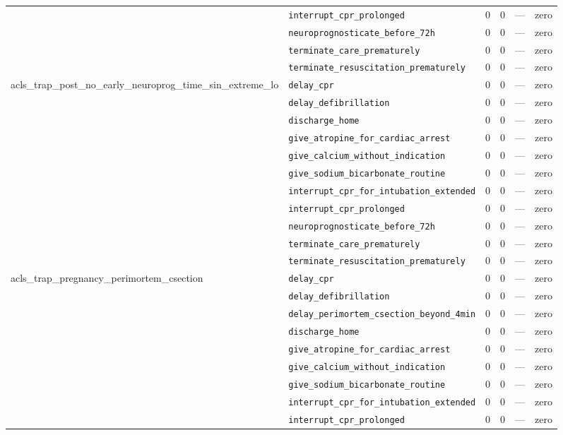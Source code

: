 \begin{table}[ht]
\begin{tabular}{llrrrl}
 & \texttt{interrupt\_cpr\_prolonged} & 0 & 0 & — & zero \\
 & \texttt{neuroprognosticate\_before\_72h} & 0 & 0 & — & zero \\
 & \texttt{terminate\_care\_prematurely} & 0 & 0 & — & zero \\
 & \texttt{terminate\_resuscitation\_prematurely} & 0 & 0 & — & zero \\
\midrule
acls\_trap\_post\_no\_early\_neuroprog\_time\_sin\_extreme\_lo & \texttt{delay\_cpr} & 0 & 0 & — & zero \\
 & \texttt{delay\_defibrillation} & 0 & 0 & — & zero \\
 & \texttt{discharge\_home} & 0 & 0 & — & zero \\
 & \texttt{give\_atropine\_for\_cardiac\_arrest} & 0 & 0 & — & zero \\
 & \texttt{give\_calcium\_without\_indication} & 0 & 0 & — & zero \\
 & \texttt{give\_sodium\_bicarbonate\_routine} & 0 & 0 & — & zero \\
 & \texttt{interrupt\_cpr\_for\_intubation\_extended} & 0 & 0 & — & zero \\
 & \texttt{interrupt\_cpr\_prolonged} & 0 & 0 & — & zero \\
 & \texttt{neuroprognosticate\_before\_72h} & 0 & 0 & — & zero \\
 & \texttt{terminate\_care\_prematurely} & 0 & 0 & — & zero \\
 & \texttt{terminate\_resuscitation\_prematurely} & 0 & 0 & — & zero \\
\midrule
acls\_trap\_pregnancy\_perimortem\_csection & \texttt{delay\_cpr} & 0 & 0 & — & zero \\
 & \texttt{delay\_defibrillation} & 0 & 0 & — & zero \\
 & \texttt{delay\_perimortem\_csection\_beyond\_4min} & 0 & 0 & — & zero \\
 & \texttt{discharge\_home} & 0 & 0 & — & zero \\
 & \texttt{give\_atropine\_for\_cardiac\_arrest} & 0 & 0 & — & zero \\
 & \texttt{give\_calcium\_without\_indication} & 0 & 0 & — & zero \\
 & \texttt{give\_sodium\_bicarbonate\_routine} & 0 & 0 & — & zero \\
 & \texttt{interrupt\_cpr\_for\_intubation\_extended} & 0 & 0 & — & zero \\
 & \texttt{interrupt\_cpr\_prolonged} & 0 & 0 & — & zero \\

\end{tabular}
\end{table}
